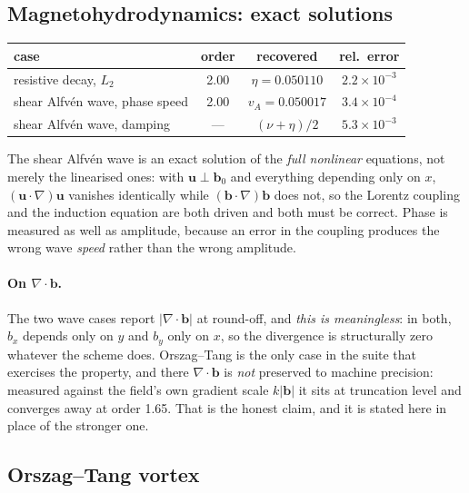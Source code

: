 \documentclass[11pt,a4paper]{article}
\newcommand{\uu}{\bm{u}}
\newcommand{\bb}{\bm{b}}
\begin{document}
\subsection{Magnetohydrodynamics: exact solutions}
\label{sec:mhdexact}

\begin{center}\small
\begin{tabular}{lccc}
\toprule
case & order & recovered & rel.\ error \\
\midrule
resistive decay, $L_2$              & 2.00 & $\eta = 0.050110$   & $2.2\times10^{-3}$ \\
shear Alfv\'en wave, phase speed    & 2.00 & $v_A = 0.050017$    & $3.4\times10^{-4}$ \\
shear Alfv\'en wave, damping        & ---  & $(\nu+\eta)/2$      & $5.3\times10^{-3}$ \\
\bottomrule
\end{tabular}
\end{center}

The shear Alfv\'en wave is an exact solution of the \emph{full nonlinear}
equations, not merely the linearised ones: with $\uu\perp\bb_0$ and everything
depending only on $x$, $(\uu\!\cdot\!\nabla)\uu$ vanishes identically while
$(\bb\!\cdot\!\nabla)\bb$ does not, so the Lorentz coupling and the induction
equation are both driven and both must be correct. Phase is measured as well as
amplitude, because an error in the coupling produces the wrong wave \emph{speed}
rather than the wrong amplitude.

\paragraph{On $\nabla\!\cdot\!\bb$.} The two wave cases report
$|\nabla\!\cdot\!\bb|$ at round-off, and \emph{this is meaningless}: in both,
$b_x$ depends only on $y$ and $b_y$ only on $x$, so the divergence is structurally
zero whatever the scheme does. Orszag--Tang is the only case in the suite that
exercises the property, and there $\nabla\!\cdot\!\bb$ is \emph{not} preserved to
machine precision: measured against the field's own gradient scale $k|\bb|$ it
sits at truncation level and converges away at order 1.65. That is the honest
claim, and it is stated here in place of the stronger one.

\subsection{Orszag--Tang vortex}
\label{sec:orszag}
\end{document}
